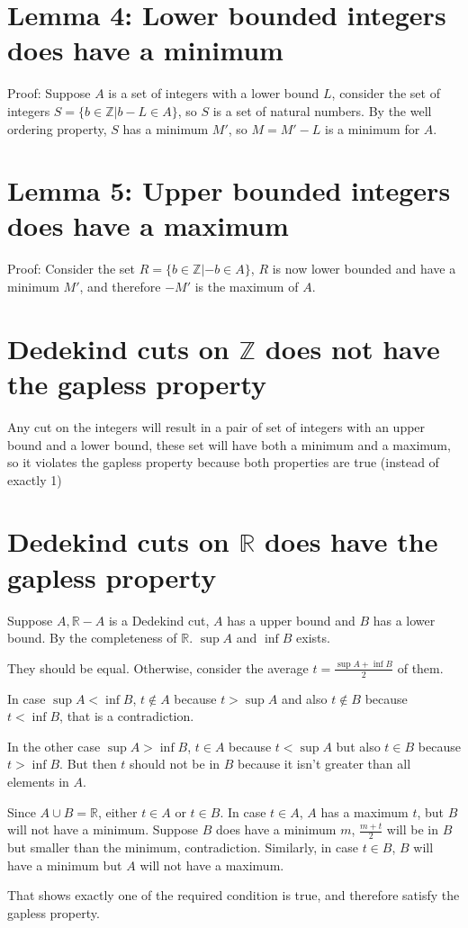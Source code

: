 \section*{Lemma 4: Lower bounded integers does have a minimum}

Proof: Suppose $ A $ is a set of integers with a lower bound $ L $, consider the set of integers $ S = \{b \in \mathbb{Z} | b - L \in A\}$, so $ S $ is a set of natural numbers. By the well ordering property, $ S $ has a minimum $ M' $, so $ M = M' - L $ is a minimum for $ A $.


\section*{Lemma 5: Upper bounded integers does have a maximum}

Proof: Consider the set $ R = \{b \in \mathbb{Z} | -b \in A\} $, $ R $ is now lower bounded and have a minimum $ M' $, and therefore $ -M' $ is the maximum of $ A $.


\section*{Dedekind cuts on $\mathbb{Z} $ does not have the gapless property}

Any cut on the integers will result in a pair of set of integers with an upper bound and a lower bound, these set will have both a minimum and a maximum, so it violates the gapless property because both properties are true (instead of exactly 1)

\section*{Dedekind cuts on $\mathbb{R} $ does have the gapless property}

Suppose $ A, \mathbb{R} - A $ is a Dedekind cut, $ A $ has a upper bound and $ B $ has a lower bound. By the completeness of $ \mathbb{R} $. $ \sup{A} $ and $ \inf{B} $ exists.

They should be equal. Otherwise, consider the average $ t = \frac{\sup{A} + \inf{B}}{2} $ of them.

In case $ \sup{A} < \inf{B} $, $ t \notin A $ because $ t > \sup A  $ and also $ t \notin B $ because $ t < \inf B $, that is a contradiction.

In the other case $ \sup A > \inf{B} $, $ t \in A $ because $ t < \sup A $ but also $ t \in B $ because $ t > \inf B $. But then $ t $ should not be in $ B $ because it isn't greater than all elements in $ A $.

Since $ A \cup B = \mathbb{R} $, either $ t \in A $ or $ t \in B $. In case $ t \in A $, $ A $ has a maximum $ t $, but $ B $ will not have a minimum. Suppose $ B $ does have a minimum $ m $, $ \frac{m + t}{2} $ will be in $ B $ but smaller than the minimum, contradiction. Similarly, in case $ t \in B $, $ B $ will have a minimum but $ A $ will not have a maximum. 

That shows exactly one of the required condition is true, and therefore satisfy the gapless property. 
